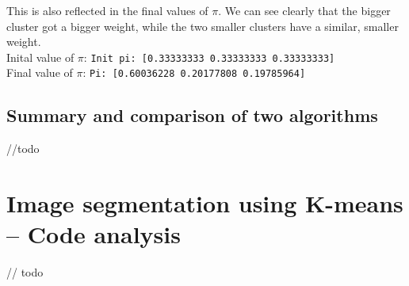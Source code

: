     This is also reflected in the final values of $\pi$.
    We can see clearly that the bigger cluster got a bigger weight, while the two smaller clusters have a similar, smaller weight.\\
    Inital value of $\pi$: \texttt{Init pi: [0.33333333 0.33333333 0.33333333]}\\
    Final value of $\pi$: \texttt{Pi: [0.60036228 0.20177808 0.19785964]}

    \subsection{Summary and comparison of two algorithms}
    //todo

    \section{Image segmentation using K-means -- Code analysis}
    // todo





